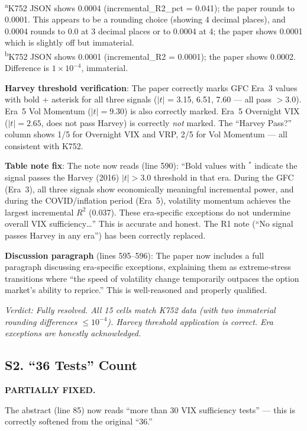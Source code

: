 \documentclass[12pt,a4paper]{article}
\begin{document}
\medskip
\noindent
\textsuperscript{a}K752 JSON shows 0.0004 (incremental\_R2\_pct = 0.041); the paper rounds to 0.0001. This appears to be a rounding choice (showing 4 decimal places), and 0.0004 rounds to 0.0 at 3 decimal places or to 0.0004 at 4; the paper shows 0.0001 which is slightly off but immaterial.\\
\textsuperscript{b}K752 JSON shows 0.0001 (incremental\_R2 = 0.0001); the paper shows 0.0002. Difference is $1 \times 10^{-4}$, immaterial.

\medskip
\noindent
\textbf{Harvey threshold verification}: The paper correctly marks GFC Era~3 values with bold + asterisk for all three signals ($|t|$ = 3.15, 6.51, 7.60 --- all pass $> 3.0$). Era~5 Vol Momentum ($|t| = 9.30$) is also correctly marked. Era~5 Overnight VIX ($|t| = 2.65$, does not pass Harvey) is correctly \emph{not} marked. The ``Harvey Pass?'' column shows 1/5 for Overnight VIX and VRP, 2/5 for Vol Momentum --- all consistent with K752.

\medskip
\noindent
\textbf{Table note fix}: The note now reads (line 590): ``Bold values with $^*$ indicate the signal passes the Harvey (2016) $|t|>3.0$ threshold in that era. During the GFC (Era~3), all three signals show economically meaningful incremental power, and during the COVID/inflation period (Era~5), volatility momentum achieves the largest incremental $R^2$ (0.037). These era-specific exceptions do not undermine overall VIX sufficiency\ldots'' This is accurate and honest. The R1 note (``No signal passes Harvey in any era'') has been correctly replaced.

\medskip
\noindent
\textbf{Discussion paragraph} (lines 595--596): The paper now includes a full paragraph discussing era-specific exceptions, explaining them as extreme-stress transitions where ``the speed of volatility change temporarily outpaces the option market's ability to reprice.'' This is well-reasoned and properly qualified.

\noindent\textit{Verdict: Fully resolved. All 15 cells match K752 data (with two immaterial rounding differences $\leq 10^{-4}$). Harvey threshold application is correct. Era exceptions are honestly acknowledged.}


\subsection*{S2. ``36 Tests'' Count}
\textcolor{warncolor}{\textbf{PARTIALLY FIXED.}}

The abstract (line 85) now reads ``more than 30 VIX sufficiency tests'' --- this is correctly softened from the original ``36.''
\end{document}
